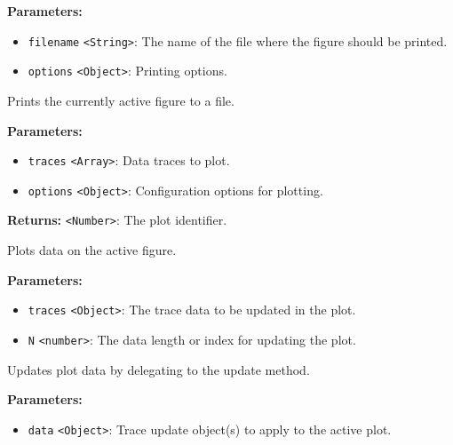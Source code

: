 \documentclass[12pt,a4paper]{article}
\begin{document}
\noindent \textbf{Parameters:}
\begin{itemize}
  \item \texttt{filename} \texttt{<String>}: The name of the file where the figure should be printed.
  \item \texttt{options} \texttt{<Object>}: Printing options.
\end{itemize}

\noindent Prints the currently active figure to a file.

\vspace{5mm}
\noindent {}


\noindent \textbf{Parameters:}
\begin{itemize}
  \item \texttt{traces} \texttt{<Array>}: Data traces to plot.
  \item \texttt{options} \texttt{<Object>}: Configuration options for plotting.
\end{itemize}

\noindent \textbf{Returns:} \texttt{<Number>}: The plot identifier.

\noindent Plots data on the active figure.

\vspace{5mm}
\noindent {}


\noindent \textbf{Parameters:}
\begin{itemize}
  \item \texttt{traces} \texttt{<Object>}: The trace data to be updated in the plot.
  \item \texttt{N} \texttt{<number>}: The data length or index for updating the plot.
\end{itemize}

\noindent Updates plot data by delegating to the \textasciigrave{}update\textasciigrave{} method.

\vspace{5mm}
\noindent {}


\noindent \textbf{Parameters:}
\begin{itemize}
  \item \texttt{data} \texttt{<Object>}: Trace update object(s) to apply to the active plot.
\end{itemize}
\end{document}
